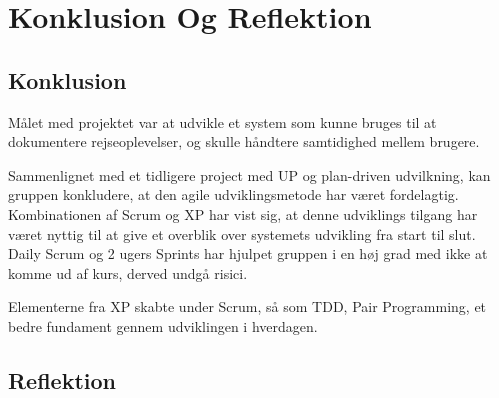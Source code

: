 \chapter{Konklusion Og Reflektion}\label{ch:KonklusionReflektion}

\section{Konklusion}
Målet med projektet var at udvikle et system som kunne bruges til at dokumentere rejseoplevelser, og skulle håndtere samtidighed mellem brugere. 

Sammenlignet med et tidligere project med UP og plan-driven udvilkning, kan gruppen konkludere, at den agile udviklingsmetode har været fordelagtig. Kombinationen af Scrum og XP har vist sig, at denne udviklings tilgang har været nyttig til at give et overblik over systemets udvikling fra start til slut. Daily Scrum og 2 ugers Sprints har hjulpet gruppen i en høj grad med ikke at komme ud af kurs, derved undgå risici. 

Elementerne fra XP skabte under Scrum, så som TDD, Pair Programming, et bedre fundament gennem udviklingen i hverdagen. 



\section{Reflektion}